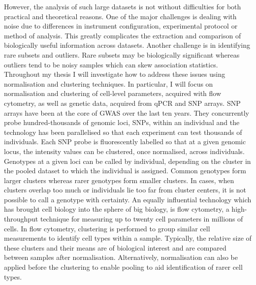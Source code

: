 However, the analysis of such large datasets is not without difficulties for both practical and theoretical reasons.
One of the major challenges is dealing with noise due to differences in instrument configuration, experimental protocol or method of analysis.
This greatly complicates the extraction and comparison of biologically useful information across datasets.
Another challenge is in identifying rare subsets and outliers.
Rare subsets may be biologically significant whereas outliers tend to be noisy samples which can skew association statistics.
Throughout my thesis I will investigate how to address these issues using normalisation and clustering techniques.
In particular, I will focus on normalisation and clustering of cell-level parameters, acquired with flow cytometry,
as well as genetic data, acquired from \gls{qPCR} and \gls{SNP} arrays.  
\gls{SNP} arrays have been at the core of \gls{GWAS} over the last ten years.
They concurrently probe hundred-thousands of genomic loci, \glspl{SNP}, within an individual and the technology
has been parallelised so that each experiment can test thousands of individuals.
Each SNP probe is fluorescently labelled so that at a given genomic locus, the intensity values can be clustered,
once normalised, across individuals.
Genotypes at a given loci can be called by individual, depending on the cluster in the pooled dataset to which the individual is assigned.
Common genotypes form larger clusters whereas rarer genotypes form smaller clusters.
In cases, when clusters overlap too much or individuals lie too far from cluster centers, it is not possible to call a genotype with certainty.
An equally influential technology which has brought cell biology into the sphere of big biology, is flow cytometry,
a high-throughput technique for measuring up to twenty cell parameters in millions of cells.
In flow cytometry, clustering is performed to group similar cell measurements to identify cell types within a sample.
Typically, the relative size of these clusters and their means are of biological interest and are compared between samples after normalisation.
Alternatively, normalisation can also be applied before the clustering to enable pooling to aid identification of rarer cell types.

